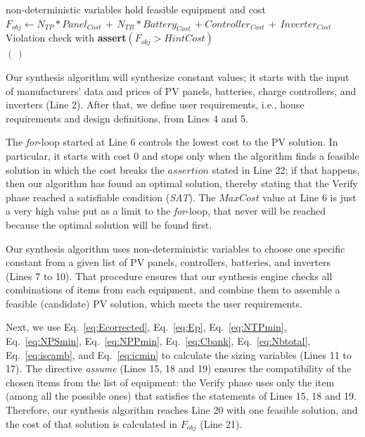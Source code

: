 \documentclass[runningheads]{llncs}
\begin{document}
\begin{algorithm}
\begin{algorithmic}[1]
\begin{scriptsize}
	\STATE non-deterministic variables hold feasible equipment and cost  \\
	\STATE $F_{obj} \leftarrow  N_{TP}*Panel_{Cost} \, + \, N_{TB}*Battery_{Cost} \, + Controller_{Cost} \, + \, Inverter_{Cost}$ \\
	\STATE Violation check with \textbf{assert}$(F_{obj} > HintCost)$ \\
  \ENDFOR
 \RETURN $(\,)$ 
  \end{scriptsize}
 \end{algorithmic} 
 \label{alg:verification-algorithm}
 \end{algorithm}

Our synthesis algorithm will synthesize constant values; it starts with the input of manufacturers' data and prices of PV panels, batteries, charge controllers, and inverters (Line 2). After that, we define user requirements, i.e., house requirements and design definitions, from Lines 4 and 5. 

The \textit{for}-loop started at Line 6 controls the lowest cost to the PV solution. In particular, it starts with cost $0$ and stops only when the algorithm finds a feasible solution in which the cost breaks the $assertion$ stated in Line 22; if that happens, then our algorithm has found an optimal solution, thereby stating that the {\sc Verify} phase reached a satisfiable condition (\textit{SAT}). The $MaxCost$ value at Line 6 is just a very high value put as a limit to the \textit{for}-loop, that never will be reached because the optimal solution will be found first.

Our synthesis algorithm uses non-deterministic variables to choose one specific constant from a given list of PV panels, controllers, batteries, and inverters (Lines 7 to 10). That procedure ensures that our synthesis engine checks all combinations of items from each equipment, and combine them to assemble a feasible (candidate) PV solution, which meets the user requirements.

Next, we use Eq.~\ref{eq:Ecorrected}, Eq.~\ref{eq:Ep}, Eq.~\ref{eq:NTPmin}, Eq.~\ref{eq:NPSmin}, Eq.~\ref{eq:NPPmin}, Eq.~\ref{eq:Cbank}, Eq.~\ref{eq:Nbtotal}, Eq.~\ref{eq:iscamb}, and Eq.~\ref{eq:icmin} to calculate the sizing variables (Lines 11 to 17). The directive \textit{assume} (Lines 15, 18 and 19) ensures the compatibility of the chosen items from the list of equipment: the {\sc Verify} phase uses only the item (among all the possible ones) that satisfies the statements of Lines 15, 18 and 19. Therefore, our synthesis algorithm reaches Line 20 with one feasible solution, and the cost of that solution is calculated in $F_{obj}$ (Line 21). 
\end{document}
